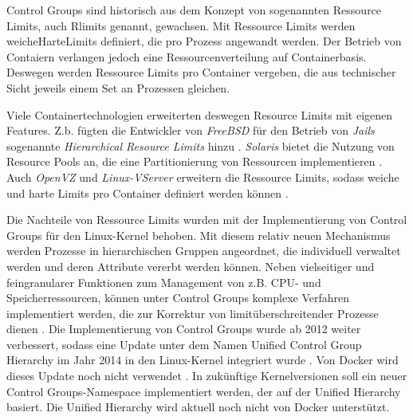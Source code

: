\documentclass[../main.tex]{subfiles}
\begin{document}
{		Control Groups sind historisch aus dem Konzept von sogenannten Ressource Limits, auch Rlimits genannt, gewachsen. Mit Ressource Limits werden \gls{weicheHarteLimits} definiert, die pro Prozess angewandt werden. Der Betrieb von Contaiern verlangen jedoch eine Ressourcenverteilung auf Containerbasis. Deswegen werden Ressource Limits pro Container vergeben, die aus technischer Sicht jeweils einem Set an Prozessen gleichen.


		Viele Containertechnologien erweiterten deswegen Resource Limits mit eigenen Features. Z.b. fügten die Entwickler von \emph{FreeBSD} für den Betrieb von \emph{Jails} sogenannte \emph{Hierarchical Resource Limits} hinzu \cite{freeBsdRCTL}. \emph{Solaris} bietet die Nutzung von Resource Pools an, die eine Partitionierung von Ressourcen implementieren \cite{cgroupsUniHierarchyDoc}. Auch \emph{OpenVZ} und \emph{Linux-VServer} erweitern die Ressource Limits, sodass weiche und harte Limits pro Container definiert werden können \cite[S.15+16]{dockerSec2}.

		Die Nachteile von Ressource Limits wurden mit der Implementierung von Control Groups für den Linux-Kernel behoben. Mit diesem relativ neuen Mechanismus werden Prozesse in hierarchischen Gruppen angeordnet, die individuell verwaltet werden und deren Attribute vererbt werden können. Neben vielseitiger und feingranularer Funktionen zum Management von z.B. CPU- und Speicherressourcen, können unter Control Groups komplexe Verfahren implementiert werden, die zur Korrektur von limitüberschreitender Prozesse dienen \cite{cgroupsRedhat}. Die Implementierung von Control Groups wurde ab 2012 weiter verbessert, sodass eine Update unter dem Namen Unified Control Group Hierarchy im Jahr 2014 in den Linux-Kernel integriert wurde \cite{cgroupsFixing}\cite{cgroupsUniHierarchy}. Von Docker wird dieses Update noch nicht verwendet \cite{githubCgroupsUniHierNotSupported}. In zukünftige Kernelversionen soll ein neuer Control Groups-Namespace implementiert werden, der auf der Unified Hierarchy basiert. Die Unified Hierarchy wird aktuell noch nicht von Docker unterstützt.

}
\end{document}
